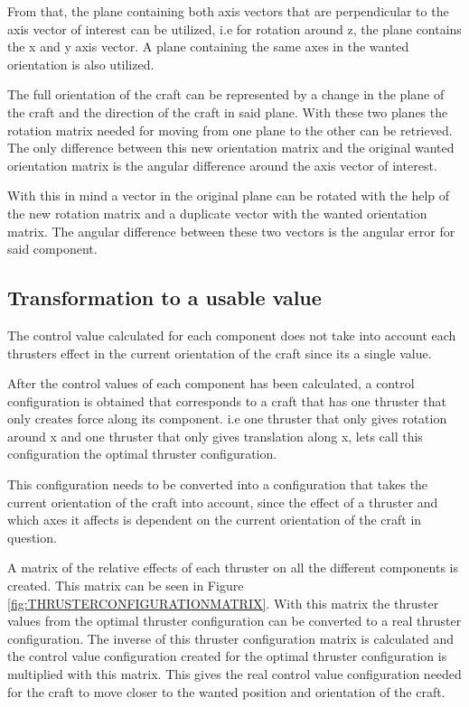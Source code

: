 From that, the plane containing both axis vectors that are perpendicular to the axis vector of interest can be utilized, i.e for rotation around z, the plane contains the x and y axis vector. A plane containing the same axes in the wanted orientation is also utilized.

The full orientation of the craft can be represented by a change in the plane of the craft and the direction of the craft in said plane. With these two planes the rotation matrix needed for moving from one plane to the other can be retrieved. The only difference between this new orientation matrix and the original wanted orientation matrix is the angular difference around the axis vector of interest.

With this in mind a vector in the original plane can be rotated with the help of the new rotation matrix and a duplicate vector with the wanted orientation matrix. The angular difference between these two vectors is the angular error for said component.

\subsection{Transformation to a usable value}
The control value calculated for each component does not take into account each thrusters effect in the current orientation of the craft since its a single value.

After the control values of each component has been calculated, a control configuration is obtained that corresponds to a craft that has one thruster that only creates force along its component. i.e one thruster that only gives rotation around x and one thruster that only gives translation along x, lets call this configuration  the optimal thruster configuration. 

This configuration needs to be converted into a configuration that takes the current orientation of the craft into account, since the effect of a thruster and which axes it affects is dependent on the current orientation of the craft in question. 

A matrix of the relative effects of each thruster on all the different components is created. This matrix can be seen in Figure \ref{fig:THRUSTERCONFIGURATIONMATRIX}. With this matrix the thruster values from the optimal thruster configuration can be converted to a real thruster configuration. The inverse of this thruster configuration matrix is calculated and the control value configuration created for the optimal thruster configuration is multiplied with this matrix. This gives the real control value configuration needed for the craft to move closer to the wanted position and orientation of the craft.

